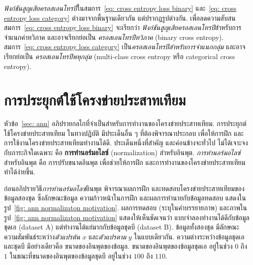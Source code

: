 \textit{ฟังก์ชันสูญเสียครอสเอนโทรปี}ในสมการ~\ref{eq: cross entropy loss binary}
และ~\ref{eq: cross entropy loss category} ต่างมาจากพื้นฐานเดียวกัน
แต่ปรากฎรูปต่างกัน.
เพื่อลดความสับสน
สมการ~\ref{eq: cross entropy loss binary} จะเรียกว่า
\textit{ฟังก์ชันสูญเสียครอสเอนโทรปี}สำหรับการจำแนกค่าทวิภาค และอาจเรียกย่อเป็น \textit{ครอสเอนโทรปีทวิภาค} 
(binary cross entropy).
สมการ~\ref{eq: cross entropy loss category} เป็น\textit{ครอสเอนโทรปีสำหรับการจำแนกกลุ่ม}
และอาจเรียกย่อเป็น \textit{ครอสเอนโทรปีพหุกลุ่ม} 
(multi-class cross entropy หรือ categorical cross entropy).

\section{การประยุกต์ใช้โครงข่ายประสาทเทียม}
\label{sec: ann applications}

หัวข้อ~\ref{sec: ann} อภิปรายกลไกที่จำเป็นสำหรับการทำงานของโครงข่ายประสาทเทียม.
การประยุกต์ใช้โครงข่ายประสาทเทียม
ในทางปฏิบัติ มีประเด็นอื่น ๆ ที่ต้องพิจารณาประกอบ
เพื่อให้การฝึก และการใช้งานโครงข่ายประสาทเทียมทำงานได้ดี.
ประเด็นหนึ่งที่สำคัญ และค่อนข้างจะทั่วไป ไม่ได้เจาะจงกับภาระกิจใดเฉพาะ 
คือ
\textbf{การทำนอร์มอไลซ์} (normalization) สำหรับอินพุต.
\textit{การทำนอร์มอไลซ์}สำหรับอินพุต 
คือ
การปรับขนาดอินพุต
เพื่อช่วยให้การฝึก
และการทำงานของโครงข่ายประสาทเทียมทำได้ง่ายขึ้น.

ก่อนอภิปรายวิธี\textit{การทำนอร์มอไลซ์}อินพุต
พิจารณาผลการฝึก และทดสอบโครงข่ายประสาทเทียมของข้อมูลสองชุด ซึ่งลักษณะข้อมูล ความก้าวหน้าในการฝึก และผลการทำนายกับข้อมูลทดสอบ แสดงในรูป~\ref{fig: ann normalizaton motivation}.
ผลการทดสอบ (ระบุในคำบรรยายภาพ)
และภาพในรูป~\ref{fig: ann normalizaton motivation}
แสดงให้เห็นชัดเจนว่า
แบบจำลองทำงานได้ดีกับข้อมูลชุดเอ (dataset A)
แต่ทำงานได้แย่มากกับข้อมูลชุดบี (dataset B).
ข้อมูลทั้งสองชุด มีลักษณะความสัมพันธ์ระหว่าง\textit{ตัวแปรต้น} $x$ และ\textit{ตัวแปรตาม} $y$ ในแบบเดียวกัน.
ความต่างระหว่างข้อมูลชุดเอและชุดบี 
มีอย่างเดียวคือ
ขนาดของอินพุตของข้อมูล.
ขนาดของอินพุตของข้อมูลชุดเอ 
อยู่ในช่วง $0$ ถึง $1$
ในขณะที่ขนาดของอินพุตของข้อมูลชุดบี 
อยู่ในช่วง $100$ ถึง $110$.


